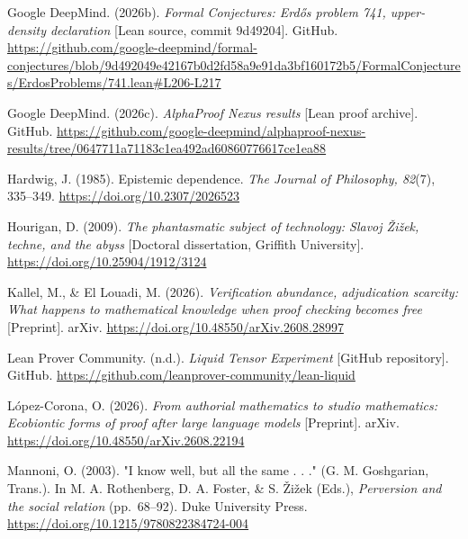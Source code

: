 \documentclass[pdflatex,sn-apa]{sn-jnl}
\begin{document}
\noindent\hangindent=0.5in Google DeepMind. (2026b). \emph{Formal Conjectures: Erdős problem 741, upper-density declaration} [Lean source, commit 9d49204]. GitHub. \url{https://github.com/google-deepmind/formal-conjectures/blob/9d492049e42167b0d2fd58a9e91da3bf160172b5/FormalConjectures/ErdosProblems/741.lean#L206-L217}\par\medskip

\noindent\hangindent=0.5in Google DeepMind. (2026c). \emph{AlphaProof Nexus results} [Lean proof archive]. GitHub. \url{https://github.com/google-deepmind/alphaproof-nexus-results/tree/0647711a71183c1ea492ad60860776617ce1ea88}\par\medskip

\noindent\hangindent=0.5in Hardwig, J. (1985). Epistemic dependence. \emph{The Journal of Philosophy, 82}(7), 335--349. \url{https://doi.org/10.2307/2026523}\par\medskip

\noindent\hangindent=0.5in Hourigan, D. (2009). \emph{The phantasmatic subject of technology: Slavoj Žižek, techne, and the abyss} [Doctoral dissertation, Griffith University]. \url{https://doi.org/10.25904/1912/3124}\par\medskip

\noindent\hangindent=0.5in Kallel, M., \& El Louadi, M. (2026). \emph{Verification abundance, adjudication scarcity: What happens to mathematical knowledge when proof checking becomes free} [Preprint]. arXiv. \url{https://doi.org/10.48550/arXiv.2608.28997}\par\medskip

\noindent\hangindent=0.5in Lean Prover Community. (n.d.). \emph{Liquid Tensor Experiment} [GitHub repository]. GitHub. \url{https://github.com/leanprover-community/lean-liquid}\par\medskip

\noindent\hangindent=0.5in López-Corona, O. (2026). \emph{From authorial mathematics to studio mathematics: Ecobiontic forms of proof after large language models} [Preprint]. arXiv. \url{https://doi.org/10.48550/arXiv.2608.22194}\par\medskip

\noindent\hangindent=0.5in Mannoni, O. (2003). "I know well, but all the same . . ." (G. M. Goshgarian, Trans.). In M. A. Rothenberg, D. A. Foster, \& S. Žižek (Eds.), \emph{Perversion and the social relation} (pp.~68--92). Duke University Press. \url{https://doi.org/10.1215/9780822384724-004}\par\medskip
\end{document}
